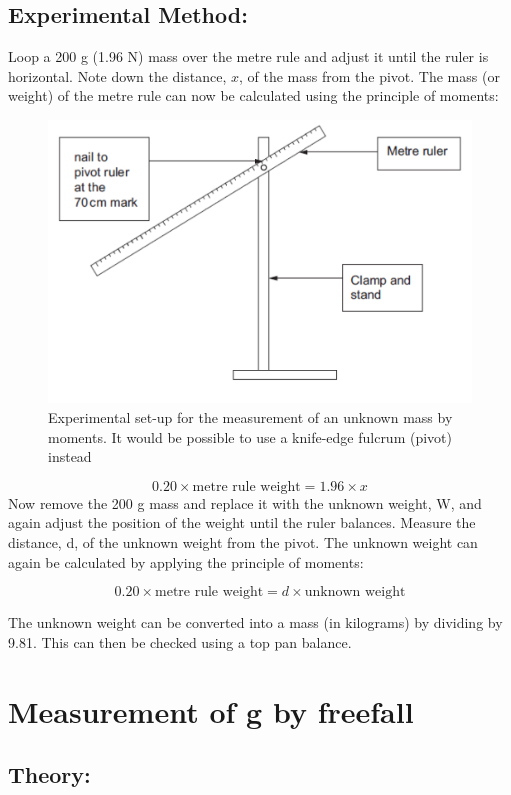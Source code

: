 \documentclass{tufte-handout}
\begin{document}
\subsection {Experimental Method:}  
Loop a 200 g (1.96 N) mass over the metre rule and adjust it until the ruler is horizontal. Note down the distance, $x$, of the mass from the pivot. The mass (or weight) of the metre rule can now be calculated using the principle of moments:  
\begin{figure}
\includegraphics[width=\textwidth]{moments.PNG}
\caption{Experimental set-up for the measurement of an unknown mass by moments. It would be possible to use a knife-edge fulcrum (pivot) instead}
\end{figure}
\[0.20 \times \text{metre rule weight} = 1.96 \times x\] Now remove the 200 g mass and replace it with the unknown weight, W, and again adjust the position of the weight until the ruler balances. Measure the distance, d, of the unknown weight from the pivot. The unknown weight can again be calculated by applying the principle of moments: 

\[0.20 \times \text{metre rule weight} = d \times \text{unknown weight} \]

The unknown weight can be converted into a mass (in kilograms) by dividing by 9.81. This can then be checked using a top pan balance. 
\section{Measurement of g by freefall}
\subsection{Theory:} 
\end{document}
